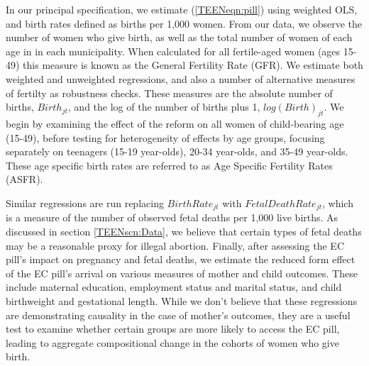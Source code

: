 In our principal specification, we estimate (\ref{TEENeqn:pill}) using weighted
OLS, and birth rates defined as births per 1,000 women.  From our data, we
observe the number of women who give birth, as well as the total number of women
of each age in in each municipality.  When calculated for all fertile-aged women
(ages 15-49) this measure is known as the General Fertility Rate (GFR).
We estimate both weighted and unweighted regressions, and also a number of
alternative measures of fertilty as robustness checks.  These measures are the
absolute number of births, $Birth_{jt}$, and the log of the number of births
plus 1, $log(Birth)_{jt}$.  We begin by examining the effect of the reform on
all women of child-bearing age (15-49), before testing for heterogeneity of
effects by age groups, focusing separately on teenagers (15-19 year-olds), 20-34
year-olds, and 35-49 year-olds.  These age specific birth rates are referred to
as Age Specific Fertility Rates (ASFR).

Similar regressions are run replacing $BirthRate_{jt}$ with
$FetalDeathRate_{jt}$, which is a measure of the number of observed fetal deaths
per 1,000 live births.  As discussed in section \ref{TEENscn:Data}, we believe
that certain types of fetal deaths may be a reasonable proxy for illegal
abortion. Finally, after assessing the EC pill's impact on pregnancy and fetal
deaths, we estimate the reduced form effect of the EC pill's arrival on various
measures of mother and child outcomes.  These include maternal education,
employment status and marital status, and child birthweight and gestational
length.  While we don't believe that these regressions are demonstrating
causality in the case of mother's outcomes, they are a useful test to examine
whether certain groups are more likely to access the EC pill, leading to aggregate
compositional change in the cohorts of women who give birth.

